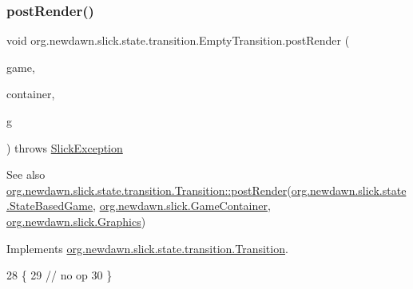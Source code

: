 \subsubsection{\texorpdfstring{post\+Render()}{postRender()}}
{\footnotesize\ttfamily void org.\+newdawn.\+slick.\+state.\+transition.\+Empty\+Transition.\+post\+Render (\begin{DoxyParamCaption}\item[{\mbox{\hyperlink{classorg_1_1newdawn_1_1slick_1_1state_1_1_state_based_game}{State\+Based\+Game}}}]{game,  }\item[{\mbox{\hyperlink{classorg_1_1newdawn_1_1slick_1_1_game_container}{Game\+Container}}}]{container,  }\item[{\mbox{\hyperlink{classorg_1_1newdawn_1_1slick_1_1_graphics}{Graphics}}}]{g }\end{DoxyParamCaption}) throws \mbox{\hyperlink{classorg_1_1newdawn_1_1slick_1_1_slick_exception}{Slick\+Exception}}\hspace{0.3cm}{\ttfamily [inline]}}

\begin{DoxySeeAlso}{See also}
\mbox{\hyperlink{interfaceorg_1_1newdawn_1_1slick_1_1state_1_1transition_1_1_transition_ac113f4d5a19962a62a8adec7f9ab5d47}{org.\+newdawn.\+slick.\+state.\+transition.\+Transition\+::post\+Render}}(\mbox{\hyperlink{classorg_1_1newdawn_1_1slick_1_1state_1_1_state_based_game}{org.\+newdawn.\+slick.\+state.\+State\+Based\+Game}}, \mbox{\hyperlink{classorg_1_1newdawn_1_1slick_1_1_game_container}{org.\+newdawn.\+slick.\+Game\+Container}}, \mbox{\hyperlink{classorg_1_1newdawn_1_1slick_1_1_graphics}{org.\+newdawn.\+slick.\+Graphics}}) 
\end{DoxySeeAlso}


Implements \mbox{\hyperlink{interfaceorg_1_1newdawn_1_1slick_1_1state_1_1transition_1_1_transition_ac113f4d5a19962a62a8adec7f9ab5d47}{org.\+newdawn.\+slick.\+state.\+transition.\+Transition}}.


\begin{DoxyCode}
28                                                                                                            
      \{
29         \textcolor{comment}{// no op}
30     \}
\end{DoxyCode}
\mbox{\label{classorg_1_1newdawn_1_1slick_1_1state_1_1transition_1_1_empty_transition_a67332f753655254f66e9beced05f59c6}} 
